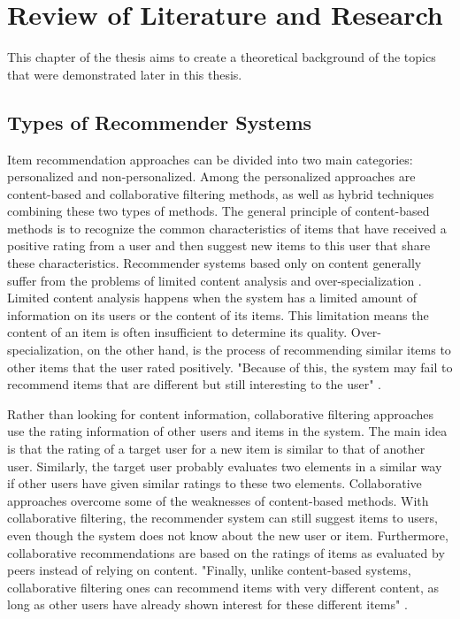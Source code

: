 
\chapter{Review of Literature and Research}\label{chapter:review_of_research}

This chapter of the thesis aims to create a theoretical background of the topics that were demonstrated later in this thesis.

\section{Types of Recommender Systems}

Item recommendation approaches can be divided into two main categories: personalized and non-personalized. Among the personalized approaches are content-based and collaborative filtering methods, as well as hybrid techniques combining these two types of methods. The general principle of content-based methods is to recognize the common characteristics of items that have received a positive rating from a user and then suggest new items to this user that share these characteristics. Recommender systems based only on content generally suffer from the problems of limited content analysis and over-specialization \cite{shardanand1995social}. Limited content analysis happens when the system has a limited amount of information on its users or the content of its items. This limitation means the content of an item is often insufficient to determine its quality. Over-specialization, on the other hand, is the process of recommending similar items to other items that the user rated positively. "Because of this, the system may fail to recommend items that are different but still interesting to the user" \cite{desrosiers2011comprehensive}.


Rather than looking for content information, collaborative filtering approaches use the rating information of other users and items in the system. The main idea is that the rating of a target user for a new item is similar to that of another user. Similarly, the target user probably evaluates two elements in a similar way if other users have given similar ratings to these two elements. Collaborative approaches overcome some of the weaknesses of content-based methods. With collaborative filtering, the recommender system can still suggest items to users, even though the system does not know about the new user or item. Furthermore, collaborative recommendations are based on the ratings of items as evaluated by peers instead of relying on content. "Finally, unlike content-based systems, collaborative filtering ones can recommend items with very different content, as long as other users have already shown interest for these different items" \cite{desrosiers2011comprehensive}.

